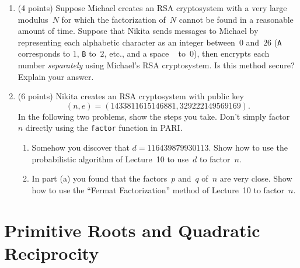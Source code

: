 \documentclass[11pt]{report}
\begin{document}
\begin{enumerate}
        \newpage
  \item (4 points)
        Suppose Michael creates an RSA cryptosystem with a very large
        modulus~$N$ for which the factorization of~$N$ cannot be found
        in a reasonable amount of time. Suppose that Nikita sends
        messages to Michael by representing each alphabetic character
        as an integer between~$0$ and~$26$ (\verb*|A| corresponds
        to $1$, \verb*|B| to~$2$, etc., and a space \verb*| | to~$0$),
        then encrypts each number {\em separately}
        using Michael's RSA cryptosystem.  Is this method secure?
        Explain your answer.

  \item (6 points)
        Nikita creates an RSA cryptosystem with public key
        $$(n,e)=(1433811615146881, 329222149569169).$$
        In the following two problems, show the steps you take.
        Don't simply factor~$n$ directly using the {\tt factor}
        function in PARI.
        \begin{enumerate}
          \item
                Somehow you discover that $d=116439879930113$.  Show how to use the
                probabilistic algorithm of Lecture~10 to use~$d$ to factor~$n$.
          \item
                In part (a) you found that the factors~$p$ and~$q$ of~$n$ are very close.
                Show how to use
                the ``Fermat Factorization'' method of Lecture~10 to factor~$n$.
        \end{enumerate}

\end{enumerate}

\section{Primitive Roots and Quadratic Reciprocity}
\end{document}
